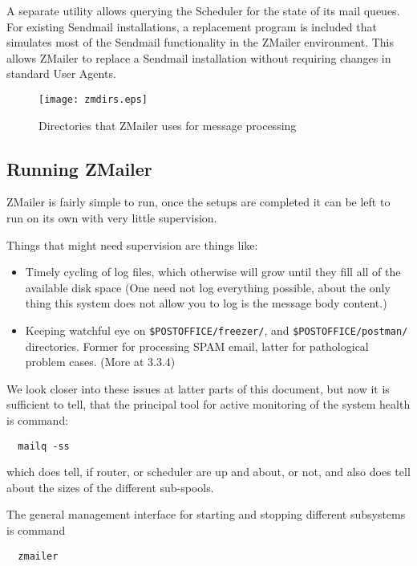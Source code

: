 A separate utility allows querying the Scheduler for the state of its mail
queues.  For existing Sendmail installations, a replacement program is
included that simulates most of the Sendmail functionality in the ZMailer
environment.  This allows ZMailer to replace a Sendmail installation
without requiring changes in standard User Agents.


\begin{figure}[ht]
  \centering\texttt{[image: zmdirs.eps]}
  \caption{\label{fig:zmdirs}Directories that ZMailer uses for message processing}
\end{figure}


\subsection{Running ZMailer}

ZMailer is fairly simple to run, once the setups are completed
it can be left to run on its own with very little supervision.

Things that might need supervision are things like:
\begin{itemize}
\item Timely cycling of log files, which otherwise will grow until
they fill all of the available disk space  (One need not log
everything possible, about the only thing this system does not
allow you to log is the message body content.)
\item Keeping watchful eye on  {\tt \$POSTOFFICE/freezer/}, and 
{\tt \$POSTOFFICE/postman/}
directories.  Former for processing SPAM email, latter for
pathological problem cases.  (More at  3.3.4)
\end{itemize}

We look closer into these issues at latter parts of this document,
but now it is sufficient to tell, that the principal tool for active
monitoring of the system health is command:
\begin{verbatim}
  mailq -ss
\end{verbatim}

which does tell, if router, or scheduler are up and about, or not,
and also does tell about the sizes of the different sub-spools.

The general management interface for starting and stopping different
subsystems is command
\begin{verbatim}
  zmailer
\end{verbatim}


